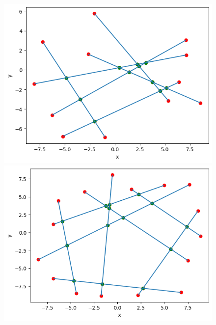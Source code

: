 \documentclass[11pt]{scrartcl}
\begin{document}
    \begin{figure}[H]
        \centering
        \begin{minipage}{0.45\linewidth}
          \centering
          \includegraphics[width=1\linewidth]{4_4.png}
          \caption{}
        \end{minipage}
        \begin{minipage}{0.45\linewidth}
          \centering
          \includegraphics[width=1\linewidth]{4_5.png}
          \caption{}
        \end{minipage}
    \end{figure}
\end{document}
